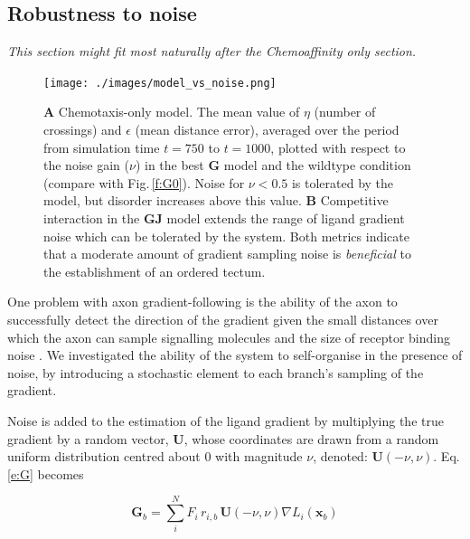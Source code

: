 \documentclass[11pt, a4paper]{article}
\begin{document}

\subsection*{Robustness to noise}

\emph{This section might fit most naturally after the Chemoaffinity only section.}

\begin{figure}
\centering
\texttt{[image: ./images/model\_vs\_noise.png]}
\caption{ \textbf{A} Chemotaxis-only model. The mean value of $\eta$ (number of crossings) and $\epsilon$
(mean distance error), averaged over the period from simulation time $t=750$ to $t=1000$, plotted with respect to the
noise gain ($\nu$) in the best $\mathbf{G}$ model and the wildtype condition (compare with
Fig.\,\ref{f:G0}). Noise for $\nu < 0.5$ is tolerated by the model, but
disorder increases above this value.
\textbf{B} Competitive interaction in the $\mathbf{GJ}$ model extends the
range of ligand gradient noise which can be tolerated by the system.
Both metrics indicate that a moderate
amount of gradient sampling noise is \emph{beneficial} to the establishment of
an ordered tectum.}
\label{f:noise}
\end{figure}

One problem with axon gradient-following is the ability of the axon to
successfully detect the direction of the gradient given the small distances
over which the axon can sample signalling molecules and the size of receptor
binding noise \citep{goodhill_noise_2014}.  We investigated the ability of the
system to self-organise in the presence of noise, by introducing a stochastic
element to each branch's sampling of the gradient.

Noise is added to the estimation of the ligand gradient by multiplying the
true gradient by a random vector, $\mathbf{U}$, whose coordinates are drawn
from a random uniform distribution centred about 0 with magnitude $\nu$, denoted:
$\mathbf{U}(-\nu, \nu)$. Eq.\,\ref{e:G} becomes

\begin{equation}\label{e:Gnu}
\mathbf{G}_b = \sum_i^N F_i\,r_{i,b}\, \mathbf{U}(-\nu, \nu) \nabla L_i(\mathbf{x}_b)
\end{equation}
\end{document}
